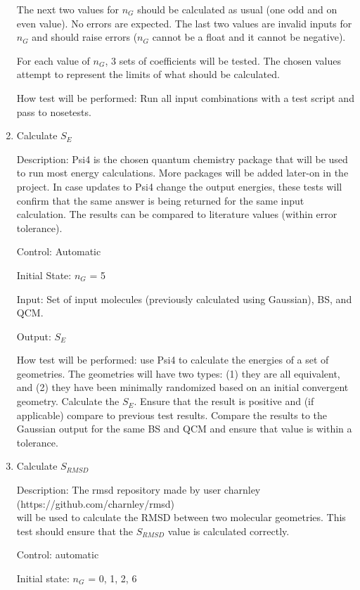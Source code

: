 \documentclass[12pt, titlepage]{article}
\begin{document}
\begin{enumerate}
	The next two values for $n_G$ should be calculated as usual (one odd and on 
	even value). No errors are expected. The last two values are invalid inputs 
	for $n_G$ and should raise errors ($n_G$ cannot be a float and it cannot be 
	negative).
	
	For each value of $n_G$, 3 sets of coefficients will be tested. The chosen 
	values attempt to represent the limits of what should be calculated.
	
	How test will be performed: Run all input combinations with a test script 
	and pass to nosetests.
	
	\item Calculate $S_E$
	
	Description: Psi4 is the chosen quantum chemistry package that will be used 
	to run most energy calculations. More packages will be added later-on in 
	the project. In case updates to Psi4 change the output energies, these 
	tests will confirm that the same answer is being returned for the same 
	input calculation. The results can be compared to literature values (within 
	error tolerance).

	Control: Automatic

	Initial State: $n_G$ = 5

	Input: Set of input molecules (previously calculated using Gaussian), BS, 
	and QCM.

	Output: $S_E$ 

	How test will be performed: use Psi4 to calculate the energies of a set of 
	geometries. The geometries will have two types: (1) they are all 
	equivalent, and (2) they have been minimally randomized based on an initial 
	convergent geometry. Calculate the $S_E$. Ensure that the result is 
	positive and (if applicable) compare to previous test results. Compare the 
	results to the Gaussian output for the same BS and QCM and ensure that 
	value is within a tolerance.
	
	\item Calculate $S_{RMSD}$
	
	Description: The rmsd repository made by user charnley \\
	(https://github.com/charnley/rmsd)\\ will be used to calculate the RMSD 
	between two molecular geometries. This test should ensure that the 
	$S_{RMSD}$ value is calculated correctly.
	
	Control: automatic
	
	Initial state: $n_G$ = 0, 1, 2, 6
	

\end{enumerate}
\end{document}
